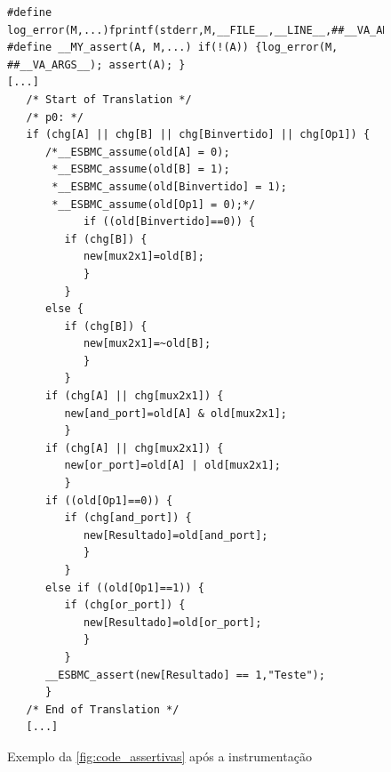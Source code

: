 \begin{figure}[H]
\caption{\label{fig:code_trad} Exemplo da \autoref{fig:code_assertivas} após a instrumentação}
	\begin{center}
    \begin{minipage}{0.7\textwidth}
    \begin{lstlisting} 
#define log_error(M,...)fprintf(stderr,M,__FILE__,__LINE__,##__VA_ARGS__)
#define __MY_assert(A, M,...) if(!(A)) {log_error(M, ##__VA_ARGS__); assert(A); }
[...]
   /* Start of Translation */
   /* p0: */
   if (chg[A] || chg[B] || chg[Binvertido] || chg[Op1]) {
      /*__ESBMC_assume(old[A] = 0);
       *__ESBMC_assume(old[B] = 1);
       *__ESBMC_assume(old[Binvertido] = 1); 
       *__ESBMC_assume(old[Op1] = 0);*/
            if ((old[Binvertido]==0)) {
         if (chg[B]) {
            new[mux2x1]=old[B];
            }
         }
      else {
         if (chg[B]) {
            new[mux2x1]=~old[B];
            }
         }
      if (chg[A] || chg[mux2x1]) {
         new[and_port]=old[A] & old[mux2x1];
         }
      if (chg[A] || chg[mux2x1]) {
         new[or_port]=old[A] | old[mux2x1];
         }
      if ((old[Op1]==0)) {
         if (chg[and_port]) {
            new[Resultado]=old[and_port];
            }
         }
      else if ((old[Op1]==1)) {
         if (chg[or_port]) {
            new[Resultado]=old[or_port];
            }
         }
      __ESBMC_assert(new[Resultado] == 1,"Teste");
      }
   /* End of Translation */
   [...]
    \end{lstlisting}
    \end{minipage}
	\end{center}
\end{figure}




